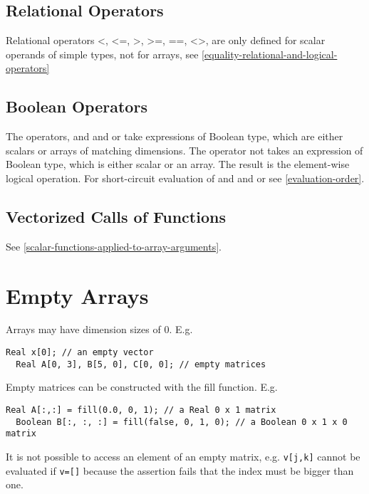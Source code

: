 \subsection{Relational Operators}

Relational operators \textless{}, \textless{}=, \textgreater{},
\textgreater{}=, ==, \textless{}\textgreater{}, are only defined for
scalar operands of simple types, not for arrays, see \ref{equality-relational-and-logical-operators}

\subsection{Boolean Operators}

The operators, and and or take expressions of Boolean type, which are
either scalars or arrays of matching dimensions. The operator not takes
an expression of Boolean type, which is either scalar or an array. The
result is the element-wise logical operation. For short-circuit
evaluation of and and or see \ref{evaluation-order}.

\subsection{Vectorized Calls of Functions}

See \ref{scalar-functions-applied-to-array-arguments}.

\section{Empty Arrays}

Arrays may have dimension sizes of 0. E.g.

\begin{lstlisting}[language=modelica]
  Real x[0]; // an empty vector
  Real A[0, 3], B[5, 0], C[0, 0]; // empty matrices
\end{lstlisting}
Empty matrices can be constructed with the fill function. E.g.

\begin{lstlisting}[language=modelica]
  Real A[:,:] = fill(0.0, 0, 1); // a Real 0 x 1 matrix
  Boolean B[:, :, :] = fill(false, 0, 1, 0); // a Boolean 0 x 1 x 0 matrix
\end{lstlisting}
It is not possible to access an element of an empty matrix, e.g.
  \lstinline!v[j,k]! cannot be evaluated if \lstinline!v=[]! because the assertion fails
that the index must be bigger than one.

